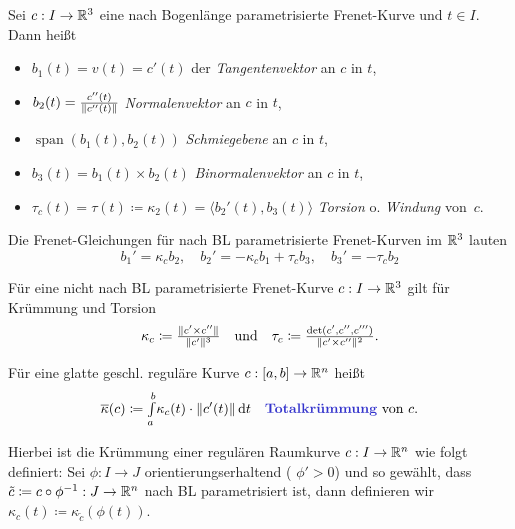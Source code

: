 \documentclass{cheat-sheet}
\newcommand{\Intabdt}[1]{\Int{a}{b}{#1}{t}}
\DeclareMathOperator{\Span}{span} %
\begin{document}
\begin{defn}
  Sei $c : I \to \mathbb{R}^3$ eine nach Bogenlänge parametrisierte Frenet-Kurve und $t \in I$. Dann heißt
  \begin{itemize}
    \item $b_1(t) = v(t) = c'(t)$ der \emph{Tangentenvektor} an $c$ in $t$,
    \item $b_2(t) = \tfrac{c''(t)}{\lVert c''(t)\rVert}$ \emph{Normalenvektor} an $c$ in $t$,
    \item $\Span(b_1(t), b_2(t))$ \emph{Schmiegebene} an $c$ in $t$,
    \item $b_3(t) = b_1(t) \times b_2(t)$ \emph{Binormalenvektor} an $c$ in $t$,
    \item $\tau_c(t) = \tau(t) \coloneqq \kappa_2(t) = \langle b_2'(t) , b_3(t) \rangle$ \emph{Torsion} o. \emph{Windung} von~$c$.
  \end{itemize}
\end{defn}

\begin{bem}
  Die Frenet-Gleichungen für nach BL parametrisierte Frenet-Kurven im $\mathbb{R}^3$ lauten
  \[
      b_1' = \kappa_c b_2, \quad
      b_2' = - \kappa_c b_1 + \tau_c b_3, \quad
      b_3' = - \tau_c b_2
  \]
\end{bem}


\begin{bem}
  Für eine nicht nach BL parametrisierte Frenet-Kurve $c : I \to \mathbb{R}^3$ gilt für Krümmung und Torsion
  \[
    \kappa_c \coloneqq \tfrac{\lVert c' \times c''\rVert}{\lVert c'\rVert^3}
    \quad \text{und} \quad
    \tau_c \coloneqq \tfrac{\det(c', c'', c''')}{\lVert c' \times c''\rVert^2}.
  \]
\end{bem}


\begin{defn}
  Für eine glatte geschl. reguläre Kurve $c : \left[ a, b \right] \to \mathbb{R}^n$ heißt
  \[
    \overline\kappa(c) \coloneqq \Intabdt{\kappa_c(t) \cdot \norm{c'(t)}}
    \quad \text{\emph{Totalkrümmung} von $c$.}
  \]

  Hierbei ist die Krümmung einer regulären Raumkurve $c : I \to \mathbb{R}^n$ wie folgt definiert:
  Sei $\phi : I \to J$ orientierungserhaltend
  (\dh{} $\phi' > 0$) und so gewählt,
  dass $\tilde{c} \coloneqq c \circ \phi^{-1} : J \to \mathbb{R}^n$ nach
  BL parametrisiert ist, dann definieren wir $\kappa_c(t) \coloneqq \kappa_{\tilde{c}}(\phi(t))$.
\end{defn}
\end{document}
